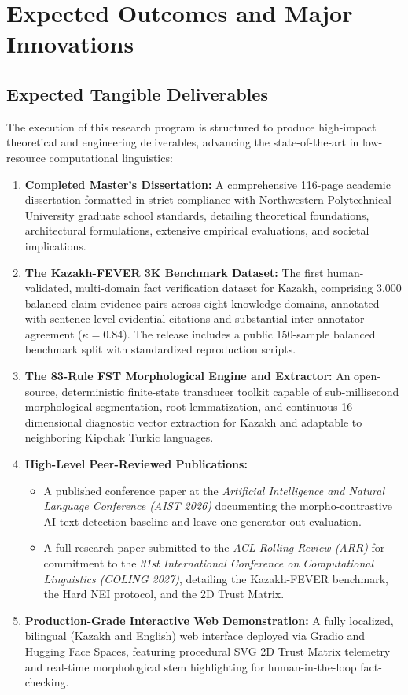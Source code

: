 \section{Expected Outcomes and Major Innovations}
\label{sec:outcomes_innovations}

\subsection{Expected Tangible Deliverables}
The execution of this research program is structured to produce high-impact theoretical and engineering deliverables, advancing the state-of-the-art in low-resource computational linguistics:

\begin{enumerate}[leftmargin=*, label=\textbf{Del \arabic*:}]
    \item \textbf{Completed Master's Dissertation:} A comprehensive 116-page academic dissertation formatted in strict compliance with Northwestern Polytechnical University graduate school standards, detailing theoretical foundations, architectural formulations, extensive empirical evaluations, and societal implications.
    \item \textbf{The Kazakh-FEVER 3K Benchmark Dataset:} The first human-validated, multi-domain fact verification dataset for Kazakh, comprising 3,000 balanced claim-evidence pairs across eight knowledge domains, annotated with sentence-level evidential citations and substantial inter-annotator agreement ($\kappa = 0.84$). The release includes a public 150-sample balanced benchmark split with standardized reproduction scripts.
    \item \textbf{The 83-Rule FST Morphological Engine and Extractor:} An open-source, deterministic finite-state transducer toolkit capable of sub-millisecond morphological segmentation, root lemmatization, and continuous 16-dimensional diagnostic vector extraction for Kazakh and adaptable to neighboring Kipchak Turkic languages.
    \item \textbf{High-Level Peer-Reviewed Publications:}
    \begin{itemize}[leftmargin=*, nosep]
        \item A published conference paper at the \textit{Artificial Intelligence and Natural Language Conference (AIST 2026)} documenting the morpho-contrastive AI text detection baseline and leave-one-generator-out evaluation.
        \item A full research paper submitted to the \textit{ACL Rolling Review (ARR)} for commitment to the \textit{31st International Conference on Computational Linguistics (COLING 2027)}, detailing the Kazakh-FEVER benchmark, the Hard NEI protocol, and the 2D Trust Matrix.
    \end{itemize}
    \item \textbf{Production-Grade Interactive Web Demonstration:} A fully localized, bilingual (Kazakh and English) web interface deployed via Gradio and Hugging Face Spaces, featuring procedural SVG 2D Trust Matrix telemetry and real-time morphological stem highlighting for human-in-the-loop fact-checking.
\end{enumerate}

